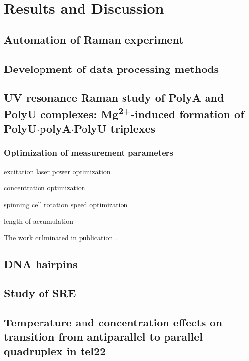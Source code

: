 \chapter{Results and Discussion}



\section{Automation of Raman experiment}

\section{Development of data processing methods}

\section[\texorpdfstring{%
    UV resonance Raman study of PolyA and PolyU complexes:\\
		Mg\textsuperscript{2+}\babelhyphen{nobreak}induced formation of
		PolyU$\cdot$polyA$\cdot$PolyU triplexes
}{%
    UV resonance Raman study of PolyA and PolyU complexes:
		Mg\texttwosuperior\textplussuperior-induced formation of PolyU·polyA·PolyU
		triplexes
}]{%
    UV resonance Raman study of PolyA and PolyU complexes:
		Mg\textsuperscript{2+}-induced formation of PolyU$\cdot$polyA$\cdot$PolyU
		triplexes
}%

\subsection{Optimization of measurement parameters}
\begin{docitemize}
	\item excitation laser power optimization
	\item concentration optimization
	\item spinning cell rotation speed optimization
	\item length of accumulation
\end{docitemize}

The work culminated in publication \textcite{Klener2015}.

\section{DNA hairpins}

\section{Study of SRE}

\section[Temperature and concentration effects on transition from antiparallel to parallel quadruplex in tel22]{Temperature and concentration effects on transition from antiparallel to parallel\\ quadruplex in tel22}
